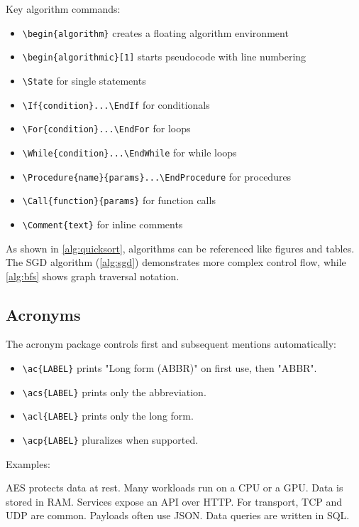 Key algorithm commands:
\begin{itemize}
    \item \verb+\begin{algorithm}+ creates a floating algorithm environment
    \item \verb+\begin{algorithmic}[1]+ starts pseudocode with line numbering
    \item \verb+\State+ for single statements
    \item \verb+\If{condition}...\EndIf+ for conditionals
    \item \verb+\For{condition}...\EndFor+ for loops
    \item \verb+\While{condition}...\EndWhile+ for while loops
    \item \verb+\Procedure{name}{params}...\EndProcedure+ for procedures
    \item \verb+\Call{function}{params}+ for function calls
    \item \verb+\Comment{text}+ for inline comments
\end{itemize}

As shown in \cref{alg:quicksort}, algorithms can be referenced like figures and tables. The SGD algorithm (\cref{alg:sgd}) demonstrates more complex control flow, while \cref{alg:bfs} shows graph traversal notation.

\subsection{Acronyms}

The acronym package controls first and subsequent mentions automatically:

\begin{itemize}
    \item \verb+\ac{LABEL}+ prints "Long form (ABBR)" on first use, then "ABBR".
    \item \verb+\acs{LABEL}+ prints only the abbreviation.
    \item \verb+\acl{LABEL}+ prints only the long form.
    \item \verb+\acp{LABEL}+ pluralizes when supported.
\end{itemize}

Examples:

\ac{AES} protects data at rest. Many workloads run on a \ac{CPU} or a \ac{GPU}. Data is stored in \ac{RAM}. Services expose an \ac{API} over \ac{HTTP}. For transport, \ac{TCP} and \ac{UDP} are common. Payloads often use \ac{JSON}. Data queries are written in \ac{SQL}.